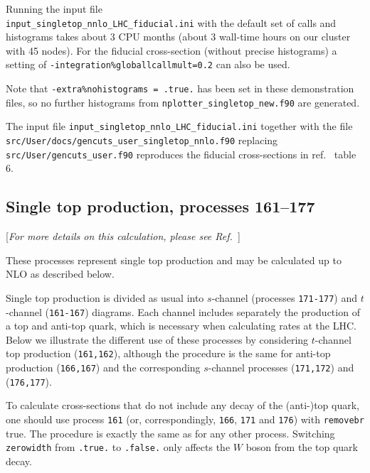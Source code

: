 Running the input file \\
\texttt{input\_singletop\_nnlo\_LHC\_fiducial.ini} with the default set
of calls and histograms takes about 3 CPU months (about 3 wall-time
hours on our cluster with 45 nodes). For the fiducial cross-section
(without precise histograms) a setting of
\texttt{-integration\%globallcallmult=0.2} can also be used.

Note that \texttt{-extra\%nohistograms\ =\ .true.} has been set in these
demonstration files, so no further histograms from
\texttt{nplotter\_singletop\_new.f90} are generated.

The input file \texttt{input\_singletop\_nnlo\_LHC\_fiducial.ini}
together with the file \\
\texttt{src/User/docs/gencuts\_user\_singletop\_nnlo.f90} replacing
\texttt{src/User/gencuts\_user.f90} reproduces the fiducial
cross-sections in ref.~\cite{Campbell:2020fhf} table 6.


\subsection{Single top production, processes 161--177}
\label{subsec:stop}

\begin{center}
[{\it For more details on this calculation, please see Ref.~\cite{Campbell:2004ch}}]
\end{center}

These processes represent single top production and may be calculated up to
NLO as described below.

Single top production is divided as usual into $s$-channel 
(processes {\tt 171-177}) and $t$-channel ({\tt 161-167})
diagrams. Each channel includes separately the production of a top
and anti-top quark, which is necessary when calculating rates at the LHC.
Below we illustrate the different use of these processes by considering
$t$-channel top production ({\tt 161,162}), although the procedure is the same
for anti-top production ({\tt 166,167}) and the corresponding $s$-channel
processes ({\tt 171,172}) and ({\tt 176,177}).


To calculate cross-sections that do not include any decay of the (anti-)top
quark, one should use process {\tt 161}
(or, correspondingly, {\tt 166}, {\tt 171} and {\tt 176}) with {\tt removebr}
true. The procedure is exactly the same
as for any other process.
Switching {\tt zerowidth} from {\tt .true.} to {\tt .false.} only affects
the $W$ boson from the top quark decay.

